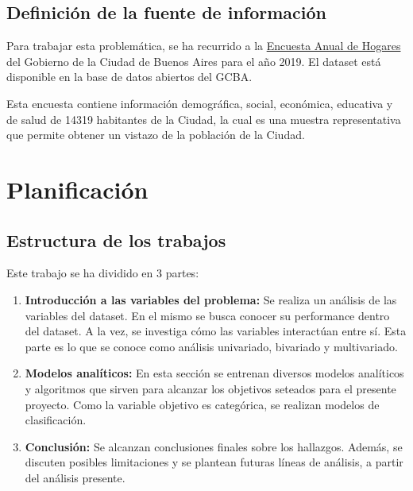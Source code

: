 \documentclass[a4paper]{article}
\begin{document}
    \subsection{Definición de la fuente de información}

        Para trabajar esta problemática, se ha recurrido a la \href{https://data.buenosaires.gob.ar/dataset/encuesta-anual-hogares/resource/3a45c563-396d-42de-ba93-8a93729e0723}{Encuesta Anual de Hogares} del Gobierno de la Ciudad de Buenos Aires para el año 2019. El dataset está disponible en la base de datos abiertos del GCBA.

        Esta encuesta contiene información demográfica, social, económica, educativa y de salud de 14319 habitantes de la Ciudad, la cual es una muestra representativa que permite obtener un vistazo de la población de la Ciudad.


\newpage

\section{Planificación}

    \subsection*{Estructura de los trabajos}

        Este trabajo se ha dividido en 3 partes:
        \begin{enumerate}
            \item \textbf{Introducción a las variables del problema:} Se realiza un análisis de las variables del dataset. En el mismo se busca conocer su performance dentro del dataset. A la vez, se investiga cómo las variables interactúan entre sí. Esta parte es lo que se conoce como análisis univariado, bivariado y multivariado.
            \item \textbf{Modelos analíticos:} En esta sección se entrenan diversos modelos analíticos y algoritmos que sirven para alcanzar los objetivos seteados para el presente proyecto. Como la variable objetivo es categórica, se realizan modelos de clasificación.
            \item \textbf{Conclusión:} Se alcanzan conclusiones finales sobre los hallazgos. Además, se discuten posibles limitaciones y se plantean futuras líneas de análisis, a partir del análisis presente.
            
        \end{enumerate}
\end{document}
